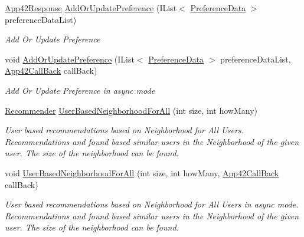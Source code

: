 \begin{DoxyCompactItemize}
\hyperlink{classcom_1_1shephertz_1_1app42_1_1paas_1_1sdk_1_1csharp_1_1_app42_response}{App42\+Response} \hyperlink{classcom_1_1shephertz_1_1app42_1_1paas_1_1sdk_1_1csharp_1_1recommend_1_1_recommender_service_a7675bc9bc9d9aa9c4be4731c30e3c11c}{Add\+Or\+Update\+Preference} (I\+List$<$ \hyperlink{classcom_1_1shephertz_1_1app42_1_1paas_1_1sdk_1_1csharp_1_1recommend_1_1_preference_data}{Preference\+Data} $>$ preference\+Data\+List)
\begin{DoxyCompactList}\small\item\em Add Or Update Preference \end{DoxyCompactList}\item 
void \hyperlink{classcom_1_1shephertz_1_1app42_1_1paas_1_1sdk_1_1csharp_1_1recommend_1_1_recommender_service_aa393d34d170bee174da9b903146913d4}{Add\+Or\+Update\+Preference} (I\+List$<$ \hyperlink{classcom_1_1shephertz_1_1app42_1_1paas_1_1sdk_1_1csharp_1_1recommend_1_1_preference_data}{Preference\+Data} $>$ preference\+Data\+List, \hyperlink{interfacecom_1_1shephertz_1_1app42_1_1paas_1_1sdk_1_1csharp_1_1_app42_call_back}{App42\+Call\+Back} call\+Back)
\begin{DoxyCompactList}\small\item\em Add Or Update Preference in async mode \end{DoxyCompactList}\item 
\hyperlink{classcom_1_1shephertz_1_1app42_1_1paas_1_1sdk_1_1csharp_1_1recommend_1_1_recommender}{Recommender} \hyperlink{classcom_1_1shephertz_1_1app42_1_1paas_1_1sdk_1_1csharp_1_1recommend_1_1_recommender_service_a8f76416b6a81a00ac30308dea2af44e7}{User\+Based\+Neighborhood\+For\+All} (int size, int how\+Many)
\begin{DoxyCompactList}\small\item\em User based recommendations based on Neighborhood for All Users. Recommendations and found based similar users in the Neighborhood of the given user. The size of the neighborhood can be found. \end{DoxyCompactList}\item 
void \hyperlink{classcom_1_1shephertz_1_1app42_1_1paas_1_1sdk_1_1csharp_1_1recommend_1_1_recommender_service_a04ae0d9c9777fc74cea2ebd2bd665f24}{User\+Based\+Neighborhood\+For\+All} (int size, int how\+Many, \hyperlink{interfacecom_1_1shephertz_1_1app42_1_1paas_1_1sdk_1_1csharp_1_1_app42_call_back}{App42\+Call\+Back} call\+Back)
\begin{DoxyCompactList}\small\item\em User based recommendations based on Neighborhood for All Users in async mode. Recommendations and found based similar users in the Neighborhood of the given user. The size of the neighborhood can be found. \end{DoxyCompactList}\item 

\end{DoxyCompactItemize}
